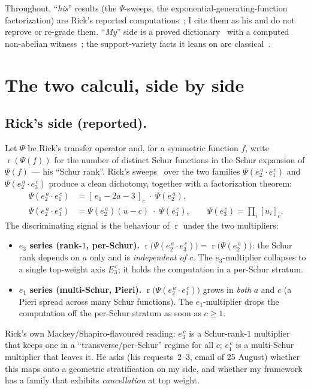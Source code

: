 \documentclass[11pt]{amsart}
\theoremstyle{plain}
\theoremstyle{definition}
\DeclareMathOperator{\rk}{r}
\begin{document}
Throughout, ``\emph{his}'' results (the $\Psi$-sweeps, the exponential-generating-function
factorization) are Rick's reported computations~\cite{rick-schur}; I cite them as his and do
not reprove or re-grade them. ``\emph{My}'' side is a proved dictionary~\cite{macbeth-ext}
with a computed non-abelian witness~\cite{macbeth-d8}; the support-variety facts it leans on
are classical~\cite{benson2,carlson-varieties,avrunin-scott,benson-carlson-rickard}.

\section{The two calculi, side by side}

\subsection{Rick's side (reported).}
Let $\Psi$ be Rick's transfer operator and, for a symmetric function $f$, write
$\rk(\Psi(f))$ for the number of distinct Schur functions in the Schur expansion of
$\Psi(f)$ --- his ``Schur rank''. Rick's sweeps~\cite{rick-schur} over the two families
$\Psi(e_2^{\,a}\cdot e_1^{\,c})$ and $\Psi(e_2^{\,a}\cdot e_3^{\,c})$ produce a clean
dichotomy, together with a factorization theorem:
\begin{align}
  \Psi(e_2^{\,a}\cdot e_1^{\,c}) &= [\,e_1-2a-3\,]_c\;\cdot\;\Psi(e_2^{\,a}), \\
  \Psi(e_2^{\,a}\cdot e_3^{\,c}) &= \Psi(e_2^{\,a})(u-c)\;\cdot\;\Psi(e_3^{\,c}),
    \qquad \Psi(e_3^{\,c})=\textstyle\prod_i [u_i]_c .
\end{align}
The discriminating signal is the behaviour of $\rk$ under the two multipliers:
\begin{itemize}
  \item \textbf{$e_3$ series (rank-$1$, per-Schur).}
    $\rk\!\big(\Psi(e_2^{\,a}\cdot e_3^{\,c})\big)=\rk\!\big(\Psi(e_2^{\,a})\big)$: the Schur
    rank depends on $a$ only and is \emph{independent of $c$}. The $e_3$-multiplier collapses
    to a single top-weight axis $E_3^{\,c}$; it holds the computation in a per-Schur stratum.
  \item \textbf{$e_1$ series (multi-Schur, Pieri).}
    $\rk\!\big(\Psi(e_2^{\,a}\cdot e_1^{\,c})\big)$ grows in \emph{both} $a$ and $c$ (a Pieri
    spread across many Schur functions). The $e_1$-multiplier drops the computation off the
    per-Schur stratum as soon as $c\ge 1$.
\end{itemize}
Rick's own Mackey/Shapiro-flavoured reading: $e_3^{\,c}$ is a Schur-rank-$1$ multiplier that
keeps one in a ``transverse/per-Schur'' regime for all $c$; $e_1^{\,c}$ is a multi-Schur
multiplier that leaves it. He asks (his requests~2--3, email of 25 August) whether this maps
onto a geometric stratification on my side, and whether my framework has a family that
exhibits \emph{cancellation} at top weight.
\end{document}
